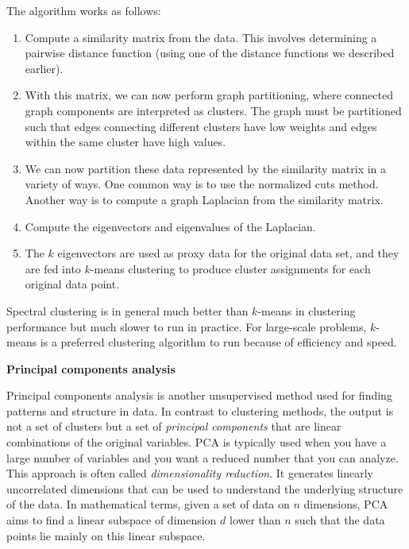 \documentclass[]{krantz}
\begin{document}
\vspace*{8pt} The algorithm works as follows:

\begin{enumerate}
\def\labelenumi{\arabic{enumi}.}
\item
  Compute a similarity matrix from the data. This involves determining a
  pairwise distance function (using one of the distance functions we
  described earlier).
\item
  With this matrix, we can now perform graph partitioning, where
  connected graph components are interpreted as clusters. The graph must
  be partitioned such that edges connecting different clusters have low
  weights and edges within the same cluster have high values.
\item
  We can now partition these data represented by the similarity matrix
  in a variety of ways. One common way is to use the normalized cuts
  method. Another way is to compute a graph Laplacian from the
  similarity matrix.
\item
  Compute the eigenvectors and eigenvalues of the Laplacian.
\item
  The \(k\) eigenvectors are used as proxy data for the original data
  set, and they are fed into \(k\)-means clustering to produce cluster
  assignments for each original data point.
\end{enumerate}

Spectral clustering is in general much better than \(k\)-means in
clustering performance but much slower to run in practice. For
large-scale problems, \(k\)-means is a preferred clustering algorithm to
run because of efficiency and speed.

\textbf{Principal components analysis}

Principal components analysis is another unsupervised method used for
finding patterns and structure in data. In contrast to clustering
methods, the output is not a set of clusters but a set of
\emph{principal components} that are linear combinations of the original
variables. PCA is typically used when you have a large number of
variables and you want a reduced number that you can analyze. This
approach is often called \emph{dimensionality reduction}. It generates
linearly uncorrelated dimensions that can be used to understand the
underlying structure of the data. In mathematical terms, given a set of
data on \(n\) dimensions, PCA aims to find a linear subspace of
dimension \(d\) lower than \(n\) such that the data points lie mainly on
this linear subspace.
\end{document}
